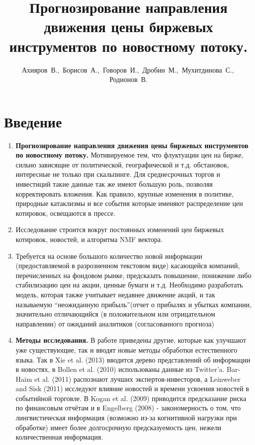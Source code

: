 \documentclass[12pt, twoside]{article}
\title
    [Прогнозирование направления движения цены биржевых инструментов по новостному потоку ] %
    {Прогнозирование направления движения цены биржевых инструментов по новостному потоку.}
\author
    {Ахияров~В.,\, Борисов~А.,\, Говоров~И.,\, Дробин~М.,\, Мухитдинова~С.,\, Родионов~В. } %
\begin{document}
\maketitle

\section{Введение}

\begin{enumerate}
\item \textbf{Прогнозирование направления движения цены биржевых инструментов по новостному потоку.}
Мотивируемое тем, что флуктуации цен на бирже, сильно зависящие от политической, географической и т.д. обстановок,  интересные не только при скальпинге. Для среднесрочных торгов и инвестиций такие данные так же имеют большую роль, позволяя корректировать вложения. Как правило, крупные изменения в политике, природные катаклизмы и все события которые именяют распределение цен котировок, освещаются в прессе. 

\item Исследование строится вокруг постоянных изменений цен биржевых котировок, новостей, и алгоритма NMF вектора.

\item Требуется на основе большого количество новой информации (предоставляемой в разрозненном текстовом виде)  касающейся компаний, перечисленных на фондовом рынке, предсказать повышение, понижение либо стабилизацию цен на акции, ценные бумаги и т.д. Необходимо разработать модель, которая также учитывает недавнее движение акций, и так называемую “неожиданную прибыль”(отчет о прибылях и убытках компании, значительно отличающийся (в положительном или отрицательном направлении) от ожиданий аналитиков (согласованного прогноза)

\item \textbf{Методы исследования.}
В работе приведены другие, которые как улучшают уже существующие, так и вводят новые методы обработки естественного языка.
Так в Xie et al. (2013) вводится дерево представлений об информации в новостях, в Bollen et al. (2010) использованы данные из Twitter'a.
Bar-Haim et al. (2011) распознают лучших экспертов-инвесторов, а Leinweber and Sisk (2011) исследуют влияние новостей и времени усвоения новостей в событийной торговле.
В Kogan et al. (2009) приводится предсказание риска по финансовым отчётам и в Engelberg (2008) - закономерность о том, что лингвистическая информация (возможно из-за когнитивной нагрузки при обработке) имеет более долгосрочную предсказуемость цен, нежели количественная информация.


\end{enumerate}
\end{document}
